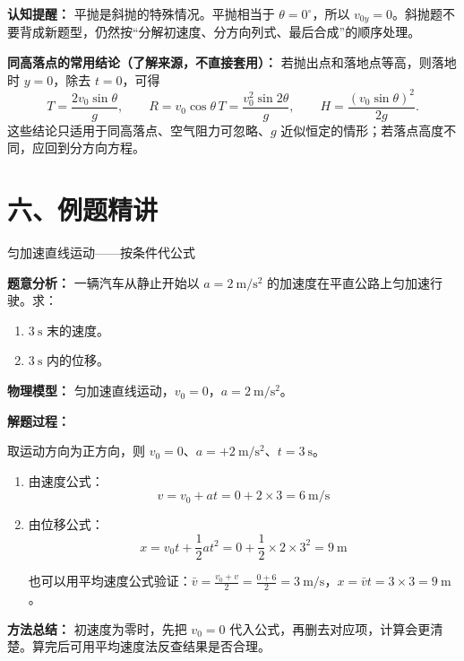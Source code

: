 \textbf{认知提醒：} 平抛是斜抛的特殊情况。平抛相当于 $\theta=0^\circ$，所以 $v_{0y}=0$。斜抛题不要背成新题型，仍然按“分解初速度、分方向列式、最后合成”的顺序处理。

\textbf{同高落点的常用结论（了解来源，不直接套用）：} 若抛出点和落地点等高，则落地时 $y=0$，除去 $t=0$，可得
\[
T=\frac{2v_0\sin\theta}{g},\qquad
R=v_0\cos\theta\, T=\frac{v_0^2\sin2\theta}{g},\qquad
H=\frac{(v_0\sin\theta)^2}{2g}.
\]
这些结论只适用于同高落点、空气阻力可忽略、$g$ 近似恒定的情形；若落点高度不同，应回到分方向方程。

\section*{六、例题精讲}

\begin{examplebox}{匀加速直线运动——按条件代公式}

\textbf{题意分析：} 一辆汽车从静止开始以 $a = 2\ \mathrm{m/s^2}$ 的加速度在平直公路上匀加速行驶。求：
\begin{enumerate}
  \item $3\ \mathrm{s}$ 末的速度。
  \item $3\ \mathrm{s}$ 内的位移。
\end{enumerate}

\textbf{物理模型：} 匀加速直线运动，$v_0 = 0$，$a = 2\ \mathrm{m/s^2}$。

\textbf{解题过程：}

取运动方向为正方向，则 $v_0=0$、$a=+2\ \mathrm{m/s^2}$、$t=3\ \mathrm{s}$。

\begin{enumerate}
  \item 由速度公式：
  \[
  v = v_0 + at = 0 + 2 \times 3 = 6\ \mathrm{m/s}
  \]

  \item 由位移公式：
  \[
  x = v_0 t + \frac12 a t^2 = 0 + \frac12 \times 2 \times 3^2 = 9\ \mathrm{m}
  \]

  也可以用平均速度公式验证：$\bar{v} = \frac{v_0+v}{2} = \frac{0+6}{2} = 3\ \mathrm{m/s}$，$x = \bar{v} t = 3 \times 3 = 9\ \mathrm{m}$。
\end{enumerate}

\textbf{方法总结：} 初速度为零时，先把 $v_0=0$ 代入公式，再删去对应项，计算会更清楚。算完后可用平均速度法反查结果是否合理。

\end{examplebox}

